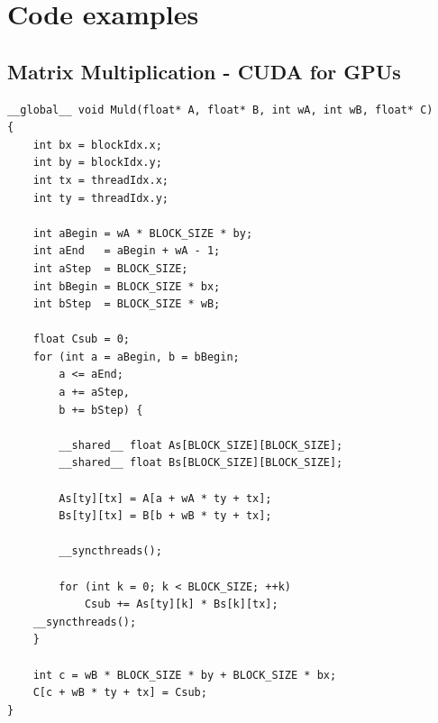 \appendix
\section{Code examples}
\subsection{Matrix Multiplication - CUDA for GPUs \cite[p. 71-73]{prog-guide-cuda}}
\label{cuda-matmult}
\lstset{language=java}
\begin{lstlisting}
__global__ void Muld(float* A, float* B, int wA, int wB, float* C) 
{
	int bx = blockIdx.x;     
	int by = blockIdx.y;     
	int tx = threadIdx.x;     
	int ty = threadIdx.y;     

	int aBegin = wA * BLOCK_SIZE * by;     
	int aEnd   = aBegin + wA - 1;     
	int aStep  = BLOCK_SIZE;     
	int bBegin = BLOCK_SIZE * bx;     
	int bStep  = BLOCK_SIZE * wB;     

	float Csub = 0;     
	for (int a = aBegin, b = bBegin;
		a <= aEnd;              
		a += aStep, 
		b += bStep) {         
	
		__shared__ float As[BLOCK_SIZE][BLOCK_SIZE];         
		__shared__ float Bs[BLOCK_SIZE][BLOCK_SIZE];         

		As[ty][tx] = A[a + wA * ty + tx];         
		Bs[ty][tx] = B[b + wB * ty + tx];         

		__syncthreads();         

		for (int k = 0; k < BLOCK_SIZE; ++k) 
			Csub += As[ty][k] * Bs[k][tx];         
	__syncthreads();    
	}     

	int c = wB * BLOCK_SIZE * by + BLOCK_SIZE * bx;     
	C[c + wB * ty + tx] = Csub; 
} 
\end{lstlisting}
